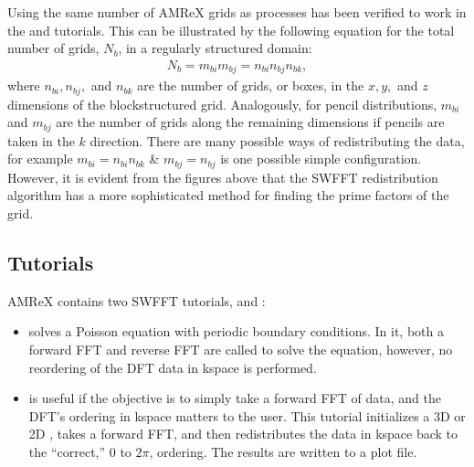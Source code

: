 \documentclass[letterpaper,10pt,english]{sphinxmanual}
\begin{document}
\sphinxAtStartPar
Using the same number of AMReX grids as processes has been verified to work in the  and  tutorials. This can be illustrated by the following equation for the total number of grids, \(N_{b}\), in a regularly structured domain:
\begin{equation*}
\begin{split}N_{b} = m_{bi} m_{bj} = n_{bi} n_{bj} n_{bk},\end{split}
\end{equation*}
\sphinxAtStartPar
where \(n_{bi}, n_{bj},\) and  \(n_{bk}\) are the number of grids, or boxes, in the \(x, y,\) and \(z\) dimensions of the block\sphinxhyphen{}structured grid. Analogously, for pencil distributions, \(m_{bi}\) and \(m_{bj}\) are the number of grids along the remaining dimensions if pencils are taken in the \(k\) direction. There are many possible ways of redistributing the data, for example \(m_{bi} = n_{bi}n_{bk}\) \& \(m_{bj} = n_{bj}\) is one possible simple configuration. However, it is evident from the figures above that the SWFFT redistribution algorithm has a more sophisticated method for finding the prime factors of the grid.


\subsection{Tutorials}
\label{\detokenize{SWFFT:tutorials}}
\sphinxAtStartPar
AMReX contains two SWFFT tutorials,  and :
\begin{itemize}
\item {} 
\sphinxAtStartPar
{} solves a Poisson equation with periodic boundary conditions.  In it, both a forward FFT
and reverse FFT are called to solve the equation, however, no reordering of the DFT data in k\sphinxhyphen{}space is performed.

\item {} 
\sphinxAtStartPar
{} is useful if the objective is to simply take a forward FFT of data,
and the DFT’s ordering in k\sphinxhyphen{}space matters to the user. This tutorial initializes a 3D or 2D ,
takes a forward FFT, and then redistributes the data in k\sphinxhyphen{}space back to the “correct,” 0 to \(2\pi\), ordering.
The results are written to a plot file.

\end{itemize}
\end{document}
